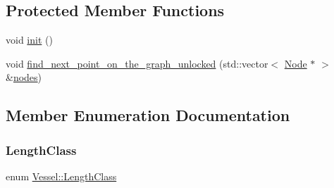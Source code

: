 \subsection*{Protected Member Functions}
\begin{DoxyCompactItemize}
\item 
void \mbox{\hyperlink{class_vessel_aea8578cbeabbfeb569b844b5a37c7cbe}{init}} ()
\item 
void \mbox{\hyperlink{class_vessel_ac236e73b62ec8344b69553ee4124e440}{find\+\_\+next\+\_\+point\+\_\+on\+\_\+the\+\_\+graph\+\_\+unlocked}} (std\+::vector$<$ \mbox{\hyperlink{class_node}{Node}} $\ast$ $>$ \&\mbox{\hyperlink{thread__vessels_8cpp_ace5675146c8515428d094fd142d8a2d2}{nodes}})
\end{DoxyCompactItemize}


\subsection{Member Enumeration Documentation}
\mbox{\label{class_vessel_a9bfc49098702d41533619fa2b2a980bf}} 
\subsubsection{\texorpdfstring{LengthClass}{LengthClass}}
{\footnotesize\ttfamily enum \mbox{\hyperlink{class_vessel_a9bfc49098702d41533619fa2b2a980bf}{Vessel\+::\+Length\+Class}}}

